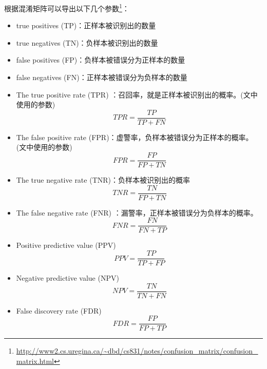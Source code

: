 \documentclass[12pt]{article}
\begin{document}
根据混淆矩阵可以导出以下几个参数\footnote{\url{http://www2.cs.uregina.ca/~dbd/cs831/notes/confusion_matrix/confusion_matrix.html}}：
\begin{itemize}
    \item true positives (TP)：正样本被识别出的数量
    \item true negatives (TN)：负样本被识别出的数量
    \item false positives (FP)：负样本被错误分为正样本的数量
    \item false negatives (FN)：正样本被错误分为负样本的数量\newline
    
    \item {\color{blue}The true positive rate (TPR) ：召回率，就是正样本被识别出的概率。}(文中使用的参数)
        \begin{displaymath}
            TPR=\frac{TP}{TP+FN}
        \end{displaymath}
     \item {\color{blue}The false positive rate (FPR)：虚警率，负样本被错误分为正样本的概率。}(文中使用的参数)
        \begin{displaymath}
            FPR=\frac{FP}{FP+TN}
        \end{displaymath}
    \item The true negative rate (TNR)：负样本被识别出的概率
        \begin{displaymath}
            TNR=\frac{TN}{FP+TN}
        \end{displaymath}

    \item The false negative rate (FNR) ：漏警率，正样本被错误分为负样本的概率。
        \begin{displaymath}
            FNR=\frac{FN}{FN+TP}
        \end{displaymath}
    \item Positive predictive value (PPV)
        \begin{displaymath}
            PPV=\frac{TP}{TP+FP}
        \end{displaymath}
    \item Negative predictive value (NPV)
        \begin{displaymath}
            NPV=\frac{TN}{TN+FN}
        \end{displaymath}
    \item False discovery rate (FDR)
        \begin{displaymath}
            FDR=\frac{FP}{FP+TP}
        \end{displaymath}
\end{itemize}
\end{document}
